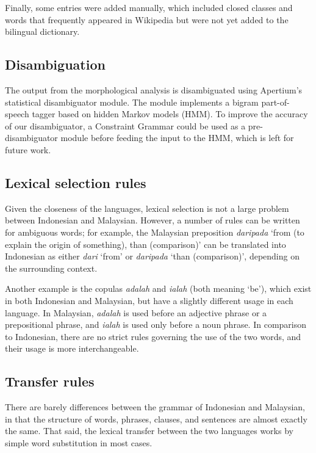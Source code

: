 \documentclass[10pt,a5paper,twoside]{article}
\begin{document}
Finally, some entries were added manually, which included closed classes and words that frequently appeared in Wikipedia but were not yet added to the bilingual dictionary.

\subsection{Disambiguation}
The output from the morphological analysis is disambiguated using Apertium's statistical disambiguator module. The module implements a bigram part-of-speech tagger based on hidden Markov models (HMM). To improve the accuracy of our disambiguator, a Constraint Grammar \citep{Karlsson1990cg} could be used as a pre-disambiguator module before feeding the input to the HMM, which is left for future work.

\subsection{Lexical selection rules}
Given the closeness of the languages, lexical selection is not a large problem between Indonesian and Malaysian. However, a number of rules can be written for ambiguous words; for example, the Malaysian preposition \emph{daripada} `from (to explain the origin of something), than (comparison)' can be translated into Indonesian as either \emph{dari} `from' or \emph{daripada} `than (comparison)', depending on the surrounding context.

Another example is the copulas \emph{adalah} and \emph{ialah} (both meaning `be'), which exist in both Indonesian and Malaysian, but have a slightly different usage in each language. In Malaysian, \emph{adalah} is used before an adjective phrase or a prepositional phrase, and \emph{ialah} is used only before a noun phrase. In comparison to Indonesian, there are no strict rules governing the use of the two words, and their usage is more interchangeable.
\subsection{Transfer rules}
There are barely differences between the grammar of Indonesian and Malaysian, in that the structure of words, phrases, clauses, and sentences are almost exactly the same. That said, the lexical transfer between the two languages works by simple word substitution in most cases.
\end{document}

